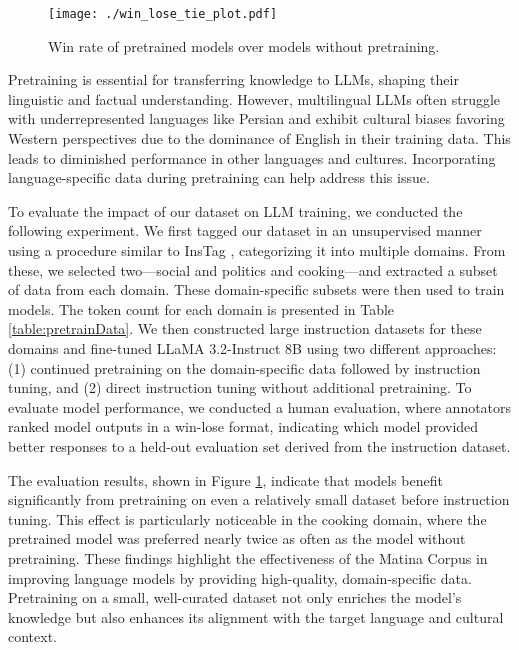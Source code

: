 \begin{figure}[b]
  \texttt{[image: ./win\_lose\_tie\_plot.pdf]}
  \caption{Win rate of pretrained models over models without pretraining.}
  \label{fig:winLose}
\end{figure}

Pretraining is essential for transferring knowledge to LLMs, shaping their linguistic and factual understanding. However, multilingual LLMs often struggle with underrepresented languages like Persian and exhibit cultural biases favoring Western perspectives \cite{cao2023assessing, alkhamissi2024investigating} due to the dominance of English in their training data. This leads to diminished performance in other languages and cultures. Incorporating language-specific data during pretraining can help address this issue.

To evaluate the impact of our dataset on LLM training, we conducted the following experiment. We first tagged our dataset in an unsupervised manner using a procedure similar to InsTag \cite{lu2023instag}, categorizing it into multiple domains. From these, we selected two—social and politics and cooking—and extracted a subset of data from each domain. These domain-specific subsets were then used to train models. The token count for each domain is presented in Table \ref{table:pretrainData}. We then constructed large instruction datasets for these domains and fine-tuned LLaMA 3.2-Instruct 8B using two different approaches: (1) continued pretraining on the domain-specific data followed by instruction tuning, and (2) direct instruction tuning without additional pretraining. To evaluate model performance, we conducted a human evaluation, where annotators ranked model outputs in a win-lose format, indicating which model provided better responses to a held-out evaluation set derived from the instruction dataset.

The evaluation results, shown in Figure \ref{fig:winLose}, indicate that models benefit significantly from pretraining on even a relatively small dataset before instruction tuning. This effect is particularly noticeable in the cooking domain, where the pretrained model was preferred nearly twice as often as the model without pretraining. These findings highlight the effectiveness of the Matina Corpus in improving language models by providing high-quality, domain-specific data. Pretraining on a small, well-curated dataset not only enriches the model’s knowledge but also enhances its alignment with the target language and cultural context.


